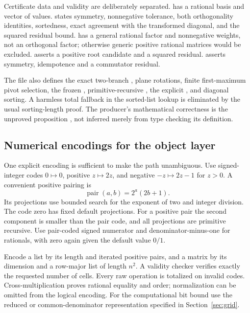 Certificate data and validity are deliberately separated.  has a rational basis and vector of values.  states symmetry, nonnegative tolerance, both orthogonality identities, sortedness, exact agreement with the transformed diagonal, and the squared residual bound.  has a general rational factor and nonnegative weights, not an orthogonal factor; otherwise generic positive rational matrices would be excluded.  asserts a positive root candidate and a squared residual.  asserts symmetry, idempotence and a commutator residual.

The file also defines the exact two-branch , plane rotations, finite first-maximum pivot selection, the frozen , primitive-recursive , the explicit , and diagonal sorting. A harmless total fallback in the sorted-list lookup is eliminated by the usual sorting-length proof. The producer's mathematical correctness is the unproved proposition , not inferred merely from type checking its definition.

\subsection{Numerical encodings for the object layer}

One explicit encoding is sufficient to make the path unambiguous. Use signed-integer codes $0\mapsto0$, positive $z\mapsto2z$, and negative $-z\mapsto2z-1$ for $z>0$. A convenient positive pairing is
\[
 \operatorname{pair}(a,b)=2^a(2b+1).
\]
Its projections use bounded search for the exponent of two and integer division. The code zero has fixed default projections. For a positive pair the second component is smaller than the pair code, and all projections are primitive recursive. Use pair-coded signed numerator and denominator-minus-one for rationals, with zero again given the default value $0/1$.

Encode a list by its length and iterated positive pairs, and a matrix by its dimension and a row-major list of length $n^2$. A validity checker verifies exactly the requested number of cells. Every raw operation is totalized on invalid codes. Cross-multiplication proves rational equality and order; normalization can be omitted from the logical encoding. For the computational bit bound use the reduced or common-denominator representation specified in Section~\ref{sec:grid}.

